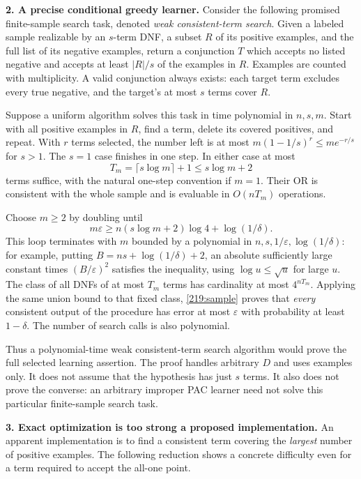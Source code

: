 \documentclass[11pt,a4paper]{article}
\newcommand{\eps}{\varepsilon}
\numberwithin{equation}{section}
\begin{document}
\textbf{2. A precise conditional greedy learner.}
Consider the following promised finite-sample search task, denoted
\emph{weak consistent-term search}. Given a labeled sample realizable by
an $s$-term DNF, a subset $R$ of its positive examples, and the full list
of its negative examples, return a conjunction $T$ which accepts no
listed negative and accepts at least $|R|/s$ of the examples in $R$.
Examples are counted with multiplicity. A valid conjunction always
exists: each target term excludes every true negative, and the target's
at most $s$ terms cover $R$.

Suppose a uniform algorithm solves this task in time polynomial in
$n,s,m$. Start with all positive examples in $R$, find a term, delete
its covered positives, and repeat. With $r$ terms selected, the number
left is at most $m(1-1/s)^r\le me^{-r/s}$ for $s>1$.
The $s=1$ case finishes in one step. In either case at most
\[
 T_m=\lceil s\log m\rceil+1\le s\log m+2
\]
terms suffice, with the natural one-step convention if $m=1$.
Their OR is consistent with the whole sample and is evaluable in
$O(nT_m)$ operations.

Choose $m\ge2$ by doubling until
\begin{equation}\label{219:sample}
 m\eps\ge n(s\log m+2)\log4+\log(1/\delta).
\end{equation}
This loop terminates with $m$ bounded by a polynomial in
$n,s,1/\eps,\log(1/\delta)$: for example, putting
$B=ns+\log(1/\delta)+2$, an absolute sufficiently large constant times
$(B/\eps)^2$ satisfies the inequality, using $\log u\le\sqrt u$ for
large $u$. The class of all DNFs of at most $T_m$ terms has cardinality
at most $4^{nT_m}$. Applying the same union bound to that fixed class,
\eqref{219:sample} proves that \emph{every} consistent output of the
procedure has error at most $\eps$ with probability at least $1-\delta$.
The number of search calls is also polynomial.

Thus a polynomial-time weak consistent-term search algorithm would prove
the full selected learning assertion. The proof handles arbitrary $D$
and uses examples only. It does not assume that the hypothesis has just
$s$ terms. It also does not prove the converse: an arbitrary improper
PAC learner need not solve this particular finite-sample search task.

\textbf{3. Exact optimization is too strong a proposed implementation.}
An apparent implementation is to find a consistent term covering the
\emph{largest} number of positive examples. The following reduction
shows a concrete difficulty even for a term required to accept the
all-one point.
\end{document}
